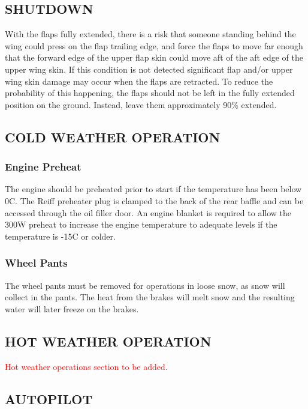 \subsection{SHUTDOWN}
\begin{Note}[CAUTION]
With the flaps fully extended, there is a risk that someone standing behind the wing could press on the flap trailing edge, and force the flaps to move far enough that the forward edge of the upper flap skin could move aft of the aft edge of the upper wing skin. If this condition is not detected significant flap and/or upper wing skin damage may occur when the flaps are retracted. To reduce the probability of this happening, the flaps should not be left in the fully extended position on the ground. Instead, leave them approximately 90\% extended.\end{Note}

\subsection{COLD WEATHER OPERATION}
\subsubsection{Engine Preheat} The engine should be preheated prior to start if the temperature has been below 0\textdegree C. The Reiff preheater plug is clamped to the back of the rear baffle and can be accessed through the oil filler door. An engine blanket is required to allow the 300W preheat to increase the engine temperature to adequate levels if the temperature is -15\textdegree C or colder.

\subsubsection{Wheel Pants} The wheel pants must be removed for operations in loose snow, as snow will collect in the pants. The heat from the brakes will melt snow and the resulting water will later freeze on the brakes.

\subsection{HOT WEATHER OPERATION}
\textcolor{red}{Hot weather operations section to be added.}

\subsection{AUTOPILOT}
